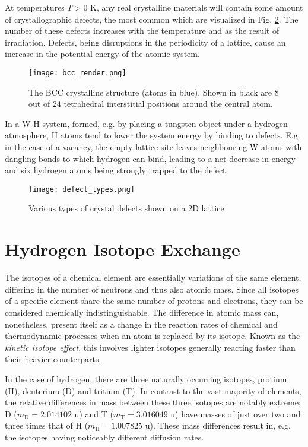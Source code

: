 At temperatures $T > 0$ K, any real crystalline materials will contain some amount of crystallographic defects, the most common which are visualized in Fig. \ref{Fig:defect_types}. 
The number of these defects increases with the temperature and as the result of irradiation. 
Defects, being disruptions in the periodicity of a lattice, cause an increase in the potential energy of the atomic system. 
\begin{figure}[!ht]
\center
\texttt{[image: bcc\_render.png]}
\caption{The BCC crystalline structure (atoms in blue). Shown in black are 8 out of 24 tetrahedral interstitial positions around the central atom.}
\label{Fig:bcc}
\end{figure}
In a W-H system, formed, e.g. by placing a tungsten object under a hydrogen atmosphere, H atoms tend to lower the system energy by binding to defects. 
E.g. in the case of a vacancy, the empty lattice site leaves neighbouring W atoms with dangling bonds to which hydrogen can bind, leading to a net decrease in energy and six hydrogen atoms being strongly trapped to the defect.

\begin{figure}[!ht]
\center
\texttt{[image: defect\_types.png]}
\caption{Various types of crystal defects shown on a 2D lattice}
\label{Fig:defect_types}
\end{figure}


\section{Hydrogen Isotope Exchange}

The isotopes of a chemical element are essentially variations of the same element, differing in the number of neutrons and thus also atomic mass. 
Since all isotopes of a specific element share the same number of protons and electrons, they can be considered chemically indistinguishable. 
The difference in atomic mass can, nonetheless, present itself as a change in the reaction rates of chemical and thermodynamic processes when an atom is replaced by its isotope. 
Known as the \textit{kinetic isotope effect}, this involves lighter isotopes generally reacting faster than their heavier counterparts. \cite{atkins2006atkins}

In the case of hydrogen, there are three naturally occurring isotopes, protium (H), deuterium (D) and tritium (T). 
In contrast to the vast majority of elements, the relative differences in mass between these three isotopes are notably extreme; D ($m_{\text{D}}=2.014102$ u) and T ($m_{\text{T}}=3.016049$ u) have masses of just over two and three times that of H ($m_{\text{H}}=1.007825$ u). 
These mass differences result in, e.g. the isotopes having noticeably different diffusion rates.

